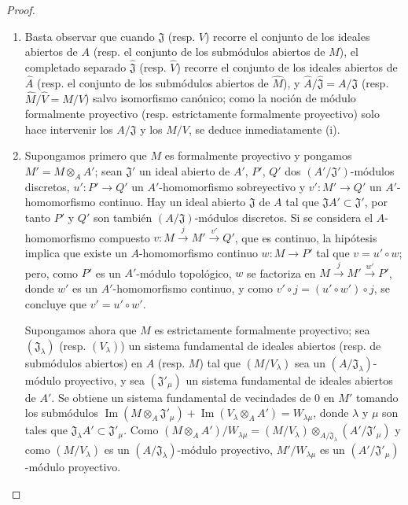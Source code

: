 \begin{proof}
\begin{enumerate}
  \item[(i)] Basta observar que cuando $\mathfrak J$ (resp. $V$)
  recorre el conjunto de los ideales abiertos de $A$ (resp. el conjunto de los
  submódulos abiertos de $M$), el completado separado $\hat{\mathfrak J}$
  (resp. $\hat V$) recorre el conjunto de los ideales abiertos de $\hat A$
  (resp. el conjunto de los submódulos abiertos de $\hat M$), y
  $\hat A/\hat{\mathfrak J}=A/\mathfrak J$ (resp.
  $\hat M/\hat V=M/V$) salvo isomorfismo canónico; como la noción
  de módulo formalmente proyectivo (resp. estrictamente formalmente proyectivo)
  solo hace intervenir los $A/\mathfrak J$ y los $M/V$, se deduce
  inmediatamente (i).
  \item[(ii)] Supongamos primero que $M$ es formalmente proyectivo y pongamos
  $M'=M\otimes_A A'$; sean $\mathfrak J'$ un ideal abierto de $A'$, $P'$,
  $Q'$ dos $(A'/\mathfrak J')$-módulos discretos, $u':P'\to Q'$ un
  $A'$-homomorfismo sobreyectivo y $v':M'\to Q'$ un $A'$-homomorfismo continuo.
  Hay un ideal abierto $\mathfrak J$ de $A$ tal que
  $\mathfrak JA'\subset\mathfrak J'$, por tanto $P'$ y $Q'$ son también
  $(A/\mathfrak J)$-módulos discretos. Si se considera el
  $A$-homomorfismo compuesto $v:M\xrightarrow{j}M'\xrightarrow{v'}Q'$, que es
  continuo, la hipótesis implica que existe un $A$-homomorfismo continuo
  $w:M\to P'$ tal que $v=u'\circ w$; pero, como $P'$ es un $A'$-módulo
  topológico, $w$ se factoriza en
  $M\xrightarrow{j}M'\xrightarrow{w'}P'$, donde $w'$ es un $A'$-homomorfismo
  continuo, y como $v'\circ j=(u'\circ w')\circ j$, se concluye que
  $v'=u'\circ w'$.

  Supongamos ahora que $M$ es estrictamente formalmente proyectivo; sea
  $(\mathfrak J_\lambda)$ (resp. $(V_\lambda)$) un sistema fundamental
  de ideales abiertos (resp. de submódulos abiertos) en $A$ (resp. $M$) tal
  que $(M/V_\lambda)$ sea un $(A/\mathfrak J_\lambda)$-módulo proyectivo,
  y sea $(\mathfrak J'_\mu)$ un sistema fundamental de ideales abiertos de
  $A'$. Se obtiene un sistema fundamental de vecindades de $0$ en $M'$ tomando
  los submódulos
  $\operatorname{Im}(M\otimes_A\mathfrak J'_\mu)
    +\operatorname{Im}(V_\lambda\otimes_A A')=W_{\lambda\mu}$,
  donde $\lambda$ y $\mu$ son tales que
  $\mathfrak J_\lambda A'\subset\mathfrak J'_\mu$. Como
  $(M\otimes_A A')/W_{\lambda\mu}
    =(M/V_\lambda)\otimes_{A/\mathfrak J_\lambda}
      (A'/\mathfrak J'_\mu)$
  y como $(M/V_\lambda)$ es un
  $(A/\mathfrak J_\lambda)$-módulo proyectivo, $M'/W_{\lambda\mu}$
  es un $(A'/\mathfrak J'_\mu)$-módulo proyectivo.
\end{enumerate}
\end{proof}


